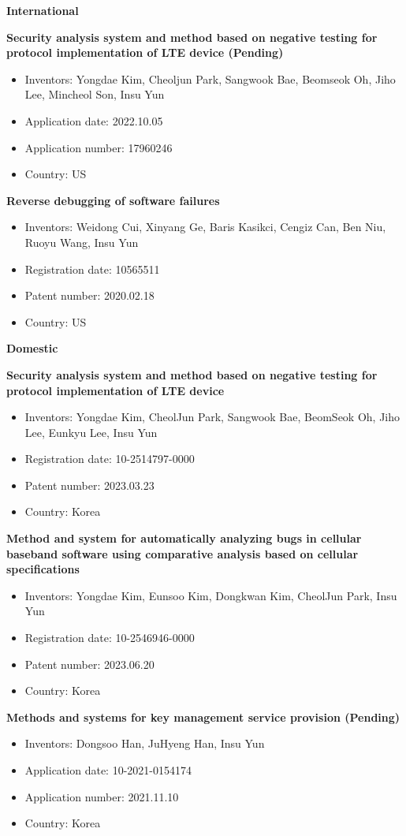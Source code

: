 \documentclass[11pt,letterpaper]{article}
\begin{document}
\begin{comment}
\sectiontitle{Reported Security Vulnerabilities}
  {{ CVE }}
\end{comment}

\newcommand{\patent}[5]{
  \item{\textbf{#1}}{}
  \begin{itemize}[label=]
    \setlength\itemsep{-0.5em}
    \vspace{-5px}
    \item Inventors: #2
    \item Registration date: #3
    \item Patent number: #4
    \item Country: #5
  \end{itemize}
}

\newcommand{\patentpending}[5]{
  \item{\textbf{#1 (Pending)}}{}
  \begin{itemize}[label=]
    \setlength\itemsep{-0.5em}
    \vspace{-5px}
    \item Inventors: #2
    \item Application date: #3
    \item Application number: #4
    \item Country: #5
  \end{itemize}
}

\textbf{International}
\begin{etaremune}
  \patentpending{Security analysis system and method based on negative testing for protocol implementation of LTE device}{Yongdae Kim, Cheoljun Park, Sangwook Bae, Beomseok Oh, Jiho Lee, Mincheol Son, Insu Yun}{2022.10.05}{17960246}{US}
  \patent{Reverse debugging of software failures}{Weidong Cui, Xinyang Ge, Baris Kasikci, Cengiz Can, Ben Niu, Ruoyu Wang, Insu Yun}{10565511}{2020.02.18}{US}
\end{etaremune}

\textbf{Domestic}
\begin{etaremune}
\patent{Security analysis system and method based on negative testing for protocol implementation of LTE device}{Yongdae Kim, CheolJun Park, Sangwook Bae, BeomSeok Oh, Jiho Lee, Eunkyu Lee, Insu Yun}{10-2514797-0000}{2023.03.23}{Korea}
  \patent{Method and system for automatically analyzing bugs in cellular baseband software using comparative analysis based on cellular specifications}{Yongdae Kim, Eunsoo Kim, Dongkwan Kim, CheolJun Park, Insu Yun}{10-2546946-0000}{2023.06.20}{Korea}
  \patentpending{Methods and systems for key management service provision}{Dongsoo Han, JuHyeng Han, Insu Yun}{10-2021-0154174}{2021.11.10}{Korea}
\end{etaremune}
\end{document}
